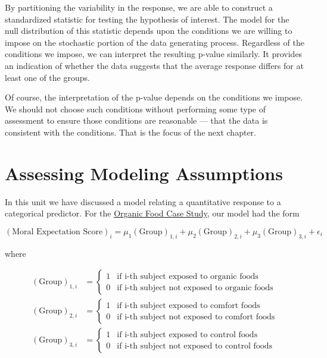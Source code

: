 \documentclass[]{book}
\theoremstyle{plain}
\theoremstyle{mydefn}
\theoremstyle{myexmpl}
\theoremstyle{remark}
\begin{document}
By partitioning the variability in the response, we are able to
construct a standardized statistic for testing the hypothesis of
interest. The model for the null distribution of this statistic depends
upon the conditions we are willing to impose on the stochastic portion
of the data generating process. Regardless of the conditions we impose,
we can interpret the resulting p-value similarly. It provides an
indication of whether the data suggests that the average response
differs for at least one of the groups.

Of course, the interpretation of the p-value depends on the conditions
we impose. We should not choose such conditions without performing some
type of assessment to ensure those conditions are reasonable --- that
the data is consistent with the conditions. That is the focus of the
next chapter.

\chapter{Assessing Modeling Assumptions}\label{ANOVAassessment}

In this unit we have discussed a model relating a quantitative response
to a categorical predictor. For the
\protect\hyperlink{CaseOrganic}{Organic Food Case Study}, our model had
the form

\[(\text{Moral Expectation Score})_i = \mu_1 (\text{Group})_{1,i} + \mu_2 (\text{Group})_{2,i} + \mu_3 (\text{Group})_{3,i} + \epsilon_i\]

where

\[
\begin{aligned}
  (\text{Group})_{1,i} &= \begin{cases}
    1 & \text{if i-th subject exposed to organic foods} \\
    0 & \text{if i-th subject not exposed to organic foods} 
    \end{cases} \\
  (\text{Group})_{2,i} &= \begin{cases}
    1 & \text{if i-th subject exposed to comfort foods} \\
    0 & \text{if i-th subject not exposed to comfort foods} 
    \end{cases} \\
  (\text{Group})_{3,i} &= \begin{cases}
    1 & \text{if i-th subject exposed to control foods} \\
    0 & \text{if i-th subject not exposed to control foods}
    \end{cases}
\end{aligned}
\]
\end{document}
